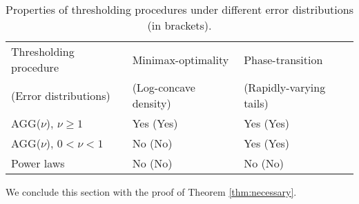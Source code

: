 \begin{table}[ht]
    \caption{Properties of thresholding procedures under different error distributions (in brackets).}
    \begin{tabular}{p{35mm}p{32mm}p{32mm}} \toprule
        Thresholding procedure & Minimax-optimality &  Phase-transition \\ 
        (Error distributions) &  (Log-concave density) & (Rapidly-varying tails) \\ \midrule
        AGG($\nu$), $\nu\ge1$ & Yes (Yes) & Yes (Yes) \\ \cmidrule{1-3}
        AGG($\nu$), $0<\nu<1$ & No (No) & Yes (Yes) \\ \cmidrule{1-3}
        Power laws & No (No) & No (No) \\ \bottomrule
    \end{tabular}
  \label{table:role-of-thresholding}
\end{table}

We conclude this section with the proof of Theorem \ref{thm:necessary}.

